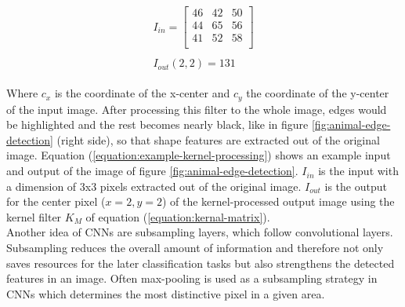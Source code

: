 \documentclass[12pt,twoside]{article}
\theoremstyle{plain}
\theoremstyle{definition}
\theoremstyle{remark}
\begin{document}
\begin{figure}
		\vspace{-20pt}
		\begin{gather}
		\label{equation:example-kernel-processing}
		\begin{split}
		I_{in} =
		\begin{bmatrix}
		46 & 42 & 50 \\
		44 & 65 & 56 \\
		41 & 52 & 58 \\
		\end{bmatrix}
		\\
		\\
		I_{out}(2,2) = 131
		\end{split}
		\end{gather}
\end{figure}
\noindent Where $c_x$ is the coordinate of the x-center and $c_y$ the coordinate of the y-center of the input image. After processing this filter to the whole image, edges would be highlighted and the rest becomes nearly black, like in figure \ref{fig:animal-edge-detection} (right side), so that shape features are extracted out of the original image.
Equation (\ref{equation:example-kernel-processing}) shows an example input and output of the image of figure \ref{fig:animal-edge-detection}. $I_{in}$ is the input with a dimension of 3x3 pixels extracted out of the original image. $I_{out}$ is the output for the center pixel ($x=2, y=2$) of the kernel-processed output image using the kernel filter $K_M$ of equation (\ref{equation:kernal-matrix}).
\\
Another idea of CNNs are subsampling layers, which follow convolutional layers. Subsampling reduces the overall amount of information and therefore not only saves resources for the later classification tasks but also strengthens the detected features in an image. Often max-pooling is used as a subsampling strategy in CNNs \cite{DeepNeuralNetworksObjectDetection-Szegedy, ImangeNetClassificationCNN-Krizhevsky} which determines the most distinctive pixel in a given area.
\end{document}
